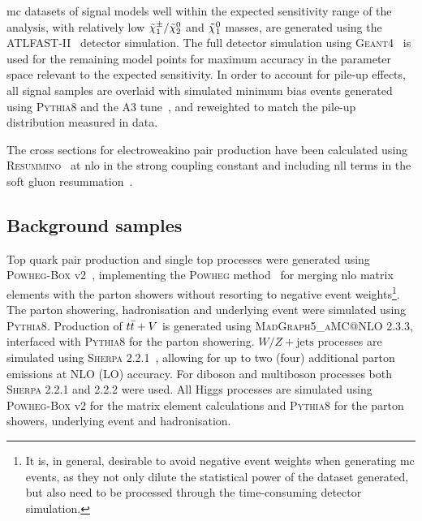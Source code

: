 \gls{mc} datasets of signal models well within the expected sensitivity range of the analysis, \ie with relatively low $\tilde{\chi}_1^\pm/\tilde{\chi}_2^0$ and $\tilde{\chi}_1^0$ masses, are generated using the \textsc{ATLFAST-II}~\cite{Aad:2010ah} detector simulation. The full detector simulation using \textsc{Geant4}~\cite{geant:2002hh} is used for the remaining model points for maximum accuracy in the parameter space relevant to the expected sensitivity. In order to account for pile-up effects, all signal samples are overlaid with simulated minimum bias events generated using \textsc{Pythia8} and the A3 tune~\cite{ATL-PHYS-PUB-2016-017}, and reweighted to match the pile-up distribution measured in data. 

The cross sections for electroweakino pair production have been calculated using \mbox{\textsc{Resummino}}~\cite{Fuks:2013vua} at \gls{nlo} in the strong coupling constant and including \gls{nll} terms in the soft gluon resummation~\cite{Fiaschi:2018hgm,Fuks:2012qx}.

\subsection{Background samples}

Top quark pair production and single top processes were generated using \textsc{Powheg-Box} v2~\cite{PowhegBox:2010xd}, implementing the \textsc{Powheg} method~\cite{Powheg1,Powheg2} for merging \gls{nlo} matrix elements with the parton showers without resorting to negative event weights\footnote{It is, in general, desirable to avoid negative event weights when generating \gls{mc} events, as they not only dilute the statistical power of the dataset generated, but also need to be processed through the time-consuming detector simulation.}.
The parton showering, hadronisation and underlying event were simulated using \textsc{Pythia8}. Production of $t\bar{t}+V$ is generated using \textsc{MadGraph5\_aMC@NLO} 2.3.3, interfaced with \textsc{Pythia8} for the parton showering. 
$W/Z+\mathrm{jets}$ processes are simulated using \textsc{Sherpa} 2.2.1~\cite{Gleisberg:2008ta,Bothmann:2019yzt}, allowing for up to two (four) additional parton emissions at NLO (LO) accuracy. 
For diboson and multiboson  processes both \textsc{Sherpa} 2.2.1 and 2.2.2 were used. 
All Higgs processes are simulated using \textsc{Powheg-Box} v2 for the matrix element calculations and \textsc{Pythia8} for the parton showers, underlying event and hadronisation. 

